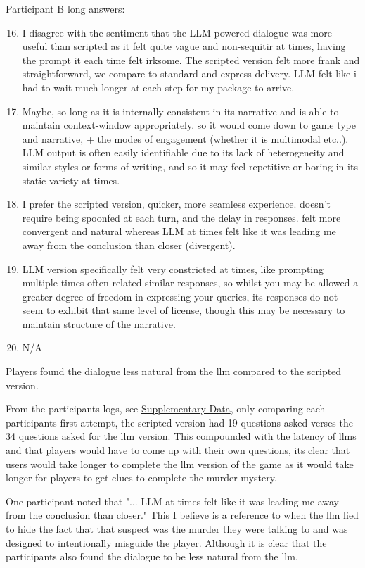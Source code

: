 \documentclass[12pt, a4paper]{report}
\begin{document}
	Participant B long answers:
	
	\begin{enumerate}
		\setcounter{enumi}{15}
		\item I disagree with the sentiment that the LLM powered dialogue was more useful than scripted as it felt quite vague and non-sequitir at times, having the prompt it each time felt irksome. The scripted version felt more frank and straightforward, we compare to standard and express delivery. LLM felt like i had to wait much longer at each step for my package to arrive.
		\item Maybe, so long as it is internally consistent in its narrative and is able to maintain context-window appropriately. so it would come down to game type and narrative, + the modes of engagement (whether it is multimodal etc..). LLM output is often easily identifiable due to its lack of heterogeneity and similar styles or forms of writing, and so it may feel repetitive or boring in its static variety at times.
		\item I prefer the scripted version, quicker, more seamless experience. doesn't require being spoonfed at each turn, and the delay in responses. felt more convergent and natural whereas LLM at times felt like it was leading me away from the conclusion than closer (divergent).
		\item LLM version specifically felt very constricted at times, like prompting multiple times often related similar responses,
		so whilst you may be allowed a greater degree of freedom in expressing your queries, its responses do not seem to exhibit that same level of license, though this may be necessary to maintain structure of the narrative.
		\item N/A
	\end{enumerate}
	
	Players found the dialogue less natural from the \gls{llm} compared to the scripted version.
	
	From the participants logs, see \hyperref[section:participantgamelogs]{Supplementary Data}, only comparing each participants first attempt, the scripted version had 19 questions asked verses the 34 questions asked for the \gls{llm} version. This compounded with the latency of \gls{llm}s and that players would have to come up with their own questions, its clear that users would take longer to complete the \gls{llm} version of the game as it would take longer for players to get clues to complete the murder mystery.
	
	One participant noted that "... LLM at times felt like it was leading me away from the conclusion than closer." This I believe is a reference to when the \gls{llm} lied to hide the fact that that suspect was the murder they were talking to and was designed to intentionally misguide the player. Although it is clear that the participants also found the dialogue to be less natural from the \gls{llm}.
	
\end{document}

